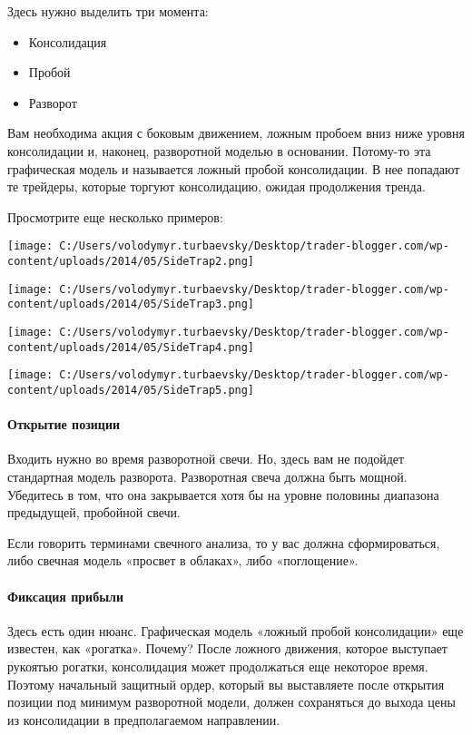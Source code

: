 \documentclass[a5paper]{article}
\begin{document}
Здесь нужно выделить три момента:
\begin{itemize}
\item     Консолидация
\item     Пробой
\item     Разворот
\end{itemize}

Вам необходима акция с боковым движением, ложным пробоем вниз ниже уровня консолидации и, наконец, разворотной моделью в основании. Потому-то эта графическая модель и называется ложный пробой консолидации. В нее попадают те трейдеры, которые торгуют консолидацию, ожидая продолжения тренда.

Просмотрите еще несколько примеров:

\texttt{[image: C:/Users/volodymyr.turbaevsky/Desktop/trader-blogger.com/wp-content/uploads/2014/05/SideTrap2.png]}

\texttt{[image: C:/Users/volodymyr.turbaevsky/Desktop/trader-blogger.com/wp-content/uploads/2014/05/SideTrap3.png]}

\texttt{[image: C:/Users/volodymyr.turbaevsky/Desktop/trader-blogger.com/wp-content/uploads/2014/05/SideTrap4.png]}

\texttt{[image: C:/Users/volodymyr.turbaevsky/Desktop/trader-blogger.com/wp-content/uploads/2014/05/SideTrap5.png]}

\paragraph{Открытие позиции}

Входить нужно во время разворотной свечи. Но, здесь вам не подойдет стандартная модель разворота. Разворотная свеча должна быть мощной. Убедитесь в том, что она закрывается хотя бы на уровне половины диапазона предыдущей, пробойной свечи.

Если говорить терминами свечного анализа, то у вас должна
сформироваться, либо свечная модель «просвет в облаках», либо
«поглощение».

\paragraph{Фиксация прибыли}

Здесь есть один нюанс. Графическая модель «ложный пробой консолидации» еще известен, как «рогатка». Почему? После ложного движения, которое выступает рукоятью рогатки, консолидация может продолжаться еще некоторое время. Поэтому начальный защитный ордер, который вы выставляете после открытия позиции под минимум разворотной модели, должен сохраняться до выхода цены из консолидации в предполагаемом направлении.
\end{document}
